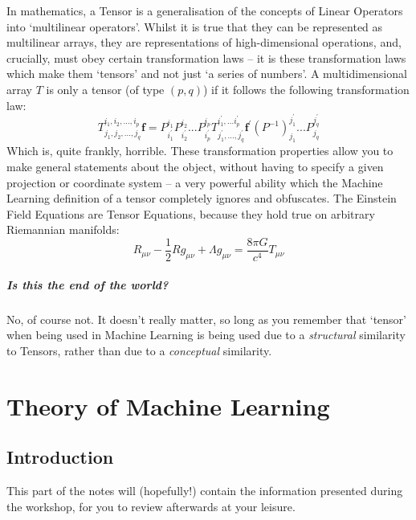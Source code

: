 \documentclass[a4paper,openany,11pt]{book}
\renewcommand\vec[1]{\boldsymbol{\mathbf{#1}}}
\begin{document}
			In mathematics, a Tensor is a generalisation of the concepts of Linear Operators into `multilinear operators'. Whilst it is true that they can be represented as multilinear arrays, they are representations of high-dimensional operations, and, crucially, must obey certain transformation laws -- it is these transformation laws which make them `tensors' and not just `a series of numbers'. A multidimensional array $T$ is only a tensor (of type $(p,q)$) if it follows the following transformation law:
			\begin{equation}
				T^{i_1,i_2,...,i_p}_{j_1,j_2,...,j_q} \vec{f} = P^{i_1}_{i^\prime_1} P^{i_2}_{i^\prime_2}...P^{i_p}_{i^\prime_p} T^{i^\prime_1,...i^\prime_p}_{j^\prime_1,...,j^\prime_q} \vec{f}^\prime (P^{-1})^{j^\prime_1}_{j_1} ...P^{j^\prime_q}_{j_q}
			\end{equation}
			Which is, quite frankly, horrible. These transformation properties allow you to make general statements about the object, without having to specify a given projection or coordinate system -- a very powerful ability which the Machine Learning definition of a tensor completely ignores and obfuscates. The Einstein Field Equations are Tensor Equations, because they hold true on arbitrary Riemannian manifolds:
			\begin{equation}
				R_{\mu\nu} - \frac{1}{2} R g_{\mu\nu} + \Lambda g_{\mu\nu} = \frac{8 \pi G}{c^4} T_{\mu \nu}
			\end{equation}



			\subsubsection{Is this the end of the world?}

			No, of course not. It doesn't really matter, so long as you remember that `tensor' when being used in Machine Learning is being used due to a \textit{structural} similarity to Tensors, rather than due to a \textit{conceptual} similarity.

	\part{Theory of Machine Learning}

		\chapter*{Introduction}

			This part of the notes will (hopefully!) contain the information presented during the workshop, for you to review afterwards at your leisure. 
\end{document}
